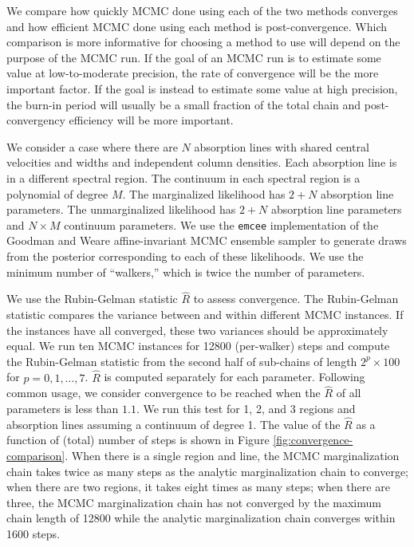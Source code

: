 \documentclass[manuscript]{aastex62}
\begin{document}
{We compare how quickly MCMC done using each of the two methods converges and how efficient MCMC done using each method is post-convergence.
Which comparison is more informative for choosing a method to use will depend on the purpose of the MCMC run.
If the goal of an MCMC run is to estimate some value at low-to-moderate precision, the rate of convergence will be the more important factor.
If the goal is instead to estimate some value at high precision, the burn-in period will usually be a small fraction of the total chain and post-convergency efficiency will be more important.

We consider a case where there are $N$ absorption lines with shared central velocities and widths and independent column densities.
Each absorption line is in a different spectral region.
The continuum in each spectral region is a polynomial of degree $M$.
The marginalized likelihood has $2 + N$ absorption line parameters.
The unmarginalized likelihood has $2 + N$ absorption line parameters and $N \times M$ continuum parameters.
We use the \texttt{emcee} implementation of the Goodman and Weare affine-invariant MCMC ensemble sampler to generate draws from the posterior corresponding to each of these likelihoods.
We use the minimum number of ``walkers,'' which is twice the number of parameters.

We use the Rubin-Gelman statistic $\hat{R}$ \citep{Gelman:1992zz} to assess convergence.
The Rubin-Gelman statistic compares the variance between and within different MCMC instances.
If the instances have all converged, these two variances should be approximately equal.
We run ten MCMC instances for 12800 (per-walker) steps and compute the Rubin-Gelman statistic from the second half of sub-chains of length $2^p \times 100$ for $p=0, 1, \ldots, 7$.
$\hat{R}$ is computed separately for each parameter.
Following common usage, we consider convergence to be reached when the $\hat{R}$ of all parameters is less than $1.1$.
We run this test for 1, 2, and 3 regions and absorption lines assuming a continuum of degree 1.
The value of the $\hat{R}$ as a function of (total) number of steps is shown in Figure \ref{fig:convergence-comparison}.
When there is a single region and line, the MCMC marginalization chain takes twice as many steps as the analytic marginalization chain to converge; when there are two regions, it takes eight times as many steps; when there are three, the MCMC marginalization chain has not converged by the maximum chain length of 12800 while the analytic marginalization chain converges within 1600 steps.

}
\end{document}
